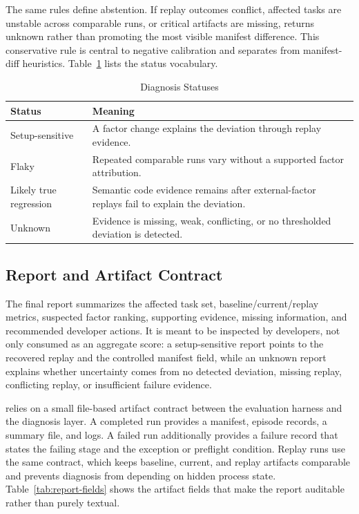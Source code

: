 The same rules define abstention. If replay outcomes conflict, affected tasks are unstable across comparable runs, or critical artifacts are missing, \sys returns unknown rather than promoting the most visible manifest difference. This conservative rule is central to negative calibration and separates \sys from manifest-diff heuristics. Table~\ref{tab:diagnosis-statuses} lists the status vocabulary.

\begin{table}[!t]
  \caption{Diagnosis Statuses}
  \label{tab:diagnosis-statuses}
  \centering
  \renewcommand{\arraystretch}{1.08}
  \begin{tabular}{@{}p{}p{}@{}}
    \toprule
    Status & Meaning \\
    \midrule
    Setup-sensitive & A factor change explains the deviation through replay evidence. \\
    Flaky & Repeated comparable runs vary without a supported factor attribution. \\
    Likely true regression & Semantic code evidence remains after external-factor replays fail to explain the deviation. \\
    Unknown & Evidence is missing, weak, conflicting, or no thresholded deviation is detected. \\
    \bottomrule
  \end{tabular}
\end{table}

\subsection{Report and Artifact Contract}

The final report summarizes the affected task set, baseline/current/replay metrics, suspected factor ranking, supporting evidence, missing information, and recommended developer actions. It is meant to be inspected by developers, not only consumed as an aggregate score: a setup-sensitive report points to the recovered replay and the controlled manifest field, while an unknown report explains whether uncertainty comes from no detected deviation, missing replay, conflicting replay, or insufficient failure evidence.

\sys relies on a small file-based artifact contract between the evaluation harness and the diagnosis layer. A completed run provides a manifest, episode records, a summary file, and logs. A failed run additionally provides a failure record that states the failing stage and the exception or preflight condition. Replay runs use the same contract, which keeps baseline, current, and replay artifacts comparable and prevents diagnosis from depending on hidden process state. Table~\ref{tab:report-fields} shows the artifact fields that make the report auditable rather than purely textual.

